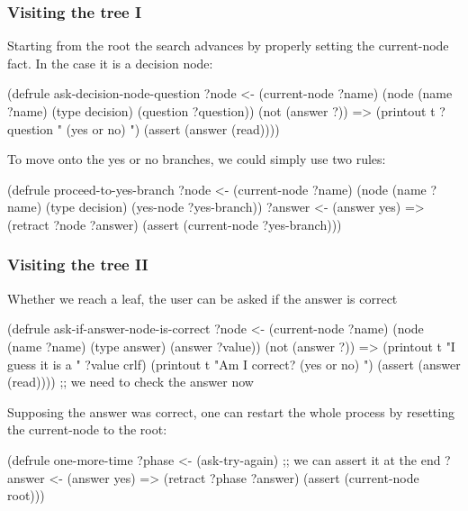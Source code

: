 \documentclass[xcolor={usenames,dvipsnames,svgnames}, compress]{beamer}
\begin{document}
\begin{frame}[fragile]
  \frametitle{Visiting the tree I}
  Starting from the root the search advances by properly setting the
  \textsf{current-node} fact. In the case it is a decision node:
  \begin{clips-code}[numbers=none]
    (defrule ask-decision-node-question
        ?node <- (current-node ?name) 
        (node (name ?name) (type decision) (question ?question))
        (not (answer ?))
        =>
        (printout t ?question " (yes or no) ")
        (assert (answer (read))))
  \end{clips-code}

  To move onto the yes or no branches, we could simply use two rules:
  \begin{clips-code}[numbers=none]
    (defrule proceed-to-yes-branch
        ?node <- (current-node ?name)
        (node (name ?name) (type decision) (yes-node ?yes-branch))
        ?answer <- (answer yes)
        =>
        (retract ?node ?answer)
        (assert (current-node ?yes-branch)))
  \end{clips-code}    
\end{frame}

\begin{frame}[fragile]
  \frametitle{Visiting the tree II}
  Whether we reach a leaf, the user can be asked if the answer is correct
  \begin{clips-code}[numbers=none]
    (defrule ask-if-answer-node-is-correct
        ?node <- (current-node ?name)
        (node (name ?name) (type answer) (answer ?value))
        (not (answer ?))
        =>
        (printout t "I guess it is a " ?value crlf)
        (printout t "Am I correct? (yes or no) ")
        (assert (answer (read)))) ;; we need to check the answer now
  \end{clips-code}

  Supposing the answer was correct, one can restart the whole process
  by resetting the \textsf{current-node} to the root:
  \begin{clips-code}[numbers=none]
    (defrule one-more-time
        ?phase <- (ask-try-again) ;; we can assert it at the end
        ?answer <- (answer yes)
        =>
        (retract ?phase ?answer)
        (assert (current-node root)))
  \end{clips-code}
      
\end{frame}
\end{document}
